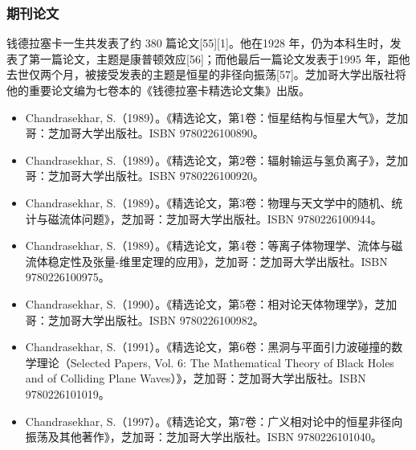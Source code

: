 \subsubsection{期刊论文}
钱德拉塞卡一生共发表了约 380 篇论文[55][1]。他在1928 年，仍为本科生时，发表了第一篇论文，主题是康普顿效应[56]；而他最后一篇论文发表于1995 年，距他去世仅两个月，被接受发表的主题是恒星的非径向振荡[57]。芝加哥大学出版社将他的重要论文编为七卷本的《钱德拉塞卡精选论文集》出版。
\begin{itemize}
\item Chandrasekhar, S.（1989）。《精选论文，第1卷：恒星结构与恒星大气》，芝加哥：芝加哥大学出版社。ISBN 9780226100890。
\item Chandrasekhar, S.（1989）。《精选论文，第2卷：辐射输运与氢负离子》，芝加哥：芝加哥大学出版社。ISBN 9780226100920。
\item Chandrasekhar, S.（1989）。《精选论文，第3卷：物理与天文学中的随机、统计与磁流体问题》，芝加哥：芝加哥大学出版社。ISBN 9780226100944。
\item Chandrasekhar, S.（1989）。《精选论文，第4卷：等离子体物理学、流体与磁流体稳定性及张量-维里定理的应用》，芝加哥：芝加哥大学出版社。ISBN 9780226100975。
\item Chandrasekhar, S.（1990）。《精选论文，第5卷：相对论天体物理学》，芝加哥：芝加哥大学出版社。ISBN 9780226100982。
\item Chandrasekhar, S.（1991）。《精选论文，第6卷：黑洞与平面引力波碰撞的数学理论（Selected Papers, Vol. 6: The Mathematical Theory of Black Holes and of Colliding Plane Waves）》，芝加哥：芝加哥大学出版社。ISBN 9780226101019。
\item Chandrasekhar, S.（1997）。《精选论文，第7卷：广义相对论中的恒星非径向振荡及其他著作》，芝加哥：芝加哥大学出版社。ISBN 9780226101040。
\end{itemize}
